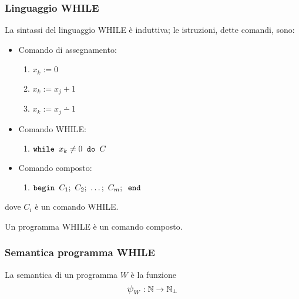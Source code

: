 \subsubsection*{Linguaggio WHILE}
La sintassi del linguaggio WHILE è induttiva; le istruzioni, dette comandi, sono:
\begin{itemize}
    \item Comando di assegnamento:
        \begin{enumerate}
            \item $x_k := 0$
            \item $x_k := x_j+1$
            \item $x_k := x_j\dotminus 1$
        \end{enumerate}
    \item Comando WHILE:
        \begin{enumerate}
            \item $ \texttt{while } x_k\neq0 \texttt{ do }  C$
        \end{enumerate}
    \item Comando composto:
        \begin{enumerate}
            \item $\textbegin C_ 1; \ C_2; \ \dots; \ C_m; \textend$
        \end{enumerate}
    \end{itemize}
dove $C_i$ è un comando WHILE.

Un programma WHILE è un comando composto.

\subsubsection*{Semantica programma WHILE}
La semantica di un programma $W$ è la funzione
    $$\semanticaWHILE_W:\N\to\N_\perp$$

